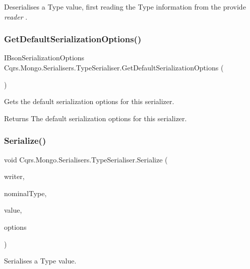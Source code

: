 Deserialises a Type value, first reading the Type information from the provide {\itshape reader} . 

\mbox{\label{classCqrs_1_1Mongo_1_1Serialisers_1_1TypeSerialiser_af0e31e1a524812836d0b73dca29b1332_af0e31e1a524812836d0b73dca29b1332}} 
\subsubsection{\texorpdfstring{Get\+Default\+Serialization\+Options()}{GetDefaultSerializationOptions()}}
{\footnotesize\ttfamily I\+Bson\+Serialization\+Options Cqrs.\+Mongo.\+Serialisers.\+Type\+Serialiser.\+Get\+Default\+Serialization\+Options (\begin{DoxyParamCaption}{ }\end{DoxyParamCaption})}



Gets the default serialization options for this serializer. 

\begin{DoxyReturn}{Returns}
The default serialization options for this serializer. 
\end{DoxyReturn}
\mbox{\label{classCqrs_1_1Mongo_1_1Serialisers_1_1TypeSerialiser_aed86906daa5c18a29fd06fb3d9d3fd13_aed86906daa5c18a29fd06fb3d9d3fd13}} 
\subsubsection{\texorpdfstring{Serialize()}{Serialize()}}
{\footnotesize\ttfamily void Cqrs.\+Mongo.\+Serialisers.\+Type\+Serialiser.\+Serialize (\begin{DoxyParamCaption}\item[{Bson\+Writer}]{writer,  }\item[{Type}]{nominal\+Type,  }\item[{object}]{value,  }\item[{I\+Bson\+Serialization\+Options}]{options }\end{DoxyParamCaption})}



Serialises a Type value. 

